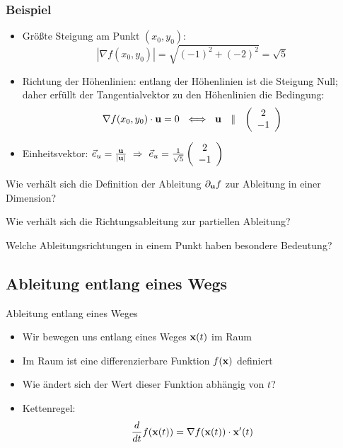    \begin{frame}
    \frametitle<presentation>{Beispiel}

    \begin{itemize}
        \item Größte Steigung am Punkt $(x_0,y_0)$:
        $$
            |\nabla f (x_0,y_0)| = \sqrt{\left(-1\right)^2+\left(-2\right)^2} = \sqrt{5}
        $$
        \item Richtung der Höhenlinien: entlang der Höhenlinien ist die Steigung Null; daher erfüllt der Tangentialvektor zu den Höhenlinien die Bedingung:
        $$
        \nabla f (x_0,y_0)\cdot \mathbf{u} = 0 ~\iff~ \mathbf{u} ~~\parallel~~ \left(\begin{array}{c}2 \\ -1\end{array}\right)
        $$
        \item Einheitsvektor:  $\vec{e}_u = \frac{\mathbf{u}}{|\mathbf{u}|} ~\Rightarrow~ \vec{e}_u= \frac{1}{\sqrt{5}}\left(\begin{array}{c}2 \\ -1\end{array}\right) $
    \end{itemize}
\end{frame}

\begin{Abschluss}
\item Wie verhält sich die Definition der Ableitung
  $\partial_{\mathbf{u}} f$ zur Ableitung in einer Dimension?
\item Wie verhält sich die Richtungsableitung zur partiellen Ableitung?
\item Welche Ableitungsrichtungen in einem Punkt haben besondere Bedeutung?
\end{Abschluss}

\subsection{Ableitung entlang eines  Wegs}
\begin{frame}{Ableitung entlang eines Weges}
  \begin{itemize}
  \item Wir bewegen uns entlang eines Weges $\mathbf{x}(t)$ im Raum
  \item Im Raum ist eine differenzierbare Funktion $f(\mathbf{x})$ definiert
  \item Wie ändert sich der Wert dieser Funktion abhängig von $t$?
  \item Kettenregel:
    \begin{gather*}
      \frac{d}{dt} f(\mathbf{x}(t)) = \nabla f(\mathbf{x}(t)) \cdot \mathbf{x}'(t)
    \end{gather*}
  \end{itemize}
\end{frame}

